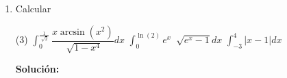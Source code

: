 \documentclass[12pt]{article}
\newenvironment{solucion}
{\begin{mdframed}[backgroundcolor=black!10]
		{\bf Solución:}\\
	}
	{
	\end{mdframed}
}
\newenvironment{preguntas}
{\begin{enumerate}\itemsep12pt
	}
	{
	\end{enumerate}
}
\newcommand{\ev}{\Big|}
\newcommand{\ra}{\rightarrow}
\begin{document}
\begin{preguntas}
\begin{solucion}
\begin{enumerate}[a)]
\item $\displaystyle\int_0^2 \dfrac{x^2}{x^3+8} dx$\\
			Usando la sustitución
			$$u=x^3+8 \ra du =  3x^2dx$$
			$$x \in (0, 2) \ra u \in (8, 16)$$
			$$\displaystyle\int_0^2 \dfrac{x^2}{x^3+8}dx = \dfrac{1}{3}\displaystyle\int_8^{16} \dfrac{du}{u} = \dfrac{1}{3}ln(u) \ev_8^{16} = \dfrac{1}{3}(ln(16)-ln(8)) = \dfrac{1}{3}ln\left(\dfrac{16}{8}\right) = \dfrac{1}{3}ln(2)$$
\item $\displaystyle\int_{-1}^1 xsen(1-x^2)dx$\\
			Usamos el cambio de variable
			$$u = 1-x^2 \ra du = -2xdx$$
			$$x \in (-1, 1) \ra u \in (0, 0)$$
			Como la variable $u$ va de 0 a 0, entonces la integral es igual a 0. Luego,
			$$\displaystyle\int_{-1}^1 xsen(1-x^2)dx = 0$$
\end{enumerate}
\end{solucion}
\item Calcular
\begin{tasks}(3)
\task $\displaystyle\int_0^{\frac{1}{\sqrt[]{2}}} \dfrac{x \arcsin(x^2)}{\sqrt[]{1-x^4}}dx$
\task $\displaystyle\int_0^{\ln(2)} e^x\ \sqrt[]{e^x-1}dx$
\task $\displaystyle\int_{-3}^{4} |x-1|dx$
\end{tasks}
\begin{solucion}


\end{solucion}
\end{preguntas}
\end{document}
